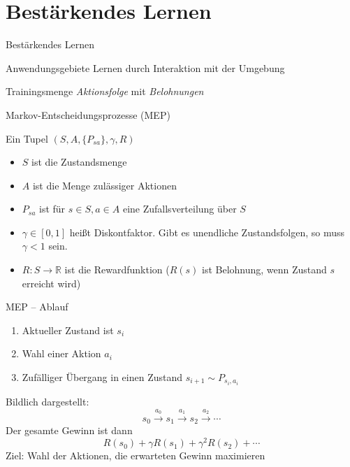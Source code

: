\documentclass[xcolor={dvipsnames,svgnames},draft]{beamer}
\begin{document}
\section{Bestärkendes Lernen}

\begin{frame}{Bestärkendes Lernen}

  \begin{exampleblock}{Anwendungsgebiete}
    Lernen durch Interaktion mit der Umgebung
  \end{exampleblock}

  \begin{block}{Trainingsmenge}
    \textit{Aktionsfolge} mit \textit{Belohnungen}
  \end{block}

\end{frame}

\begin{frame}{Markov-Entscheidungsprozesse (MEP)}

  \begin{definition}
    Ein Tupel $(S, A, \{P_{sa}\},\gamma,R)$
    \begin{itemize}
    \item $S$ ist die Zustandsmenge
    \item $A$ ist die Menge zulässiger Aktionen
    \item $P_{sa}$ ist für $s \in S, a \in A$ eine Zufallsverteilung über $S$
    \item $\gamma \in \left[ 0, 1 \right]$ heißt Diskontfaktor. Gibt es
      unendliche Zustandsfolgen, so muss $\gamma < 1$ sein.
    \item $R : S \to \mathbb{R}$ ist die Rewardfunktion ($R(s)$ ist
      Belohnung, wenn Zustand $s$ erreicht wird)
    \end{itemize}
  \end{definition}
\end{frame}

\begin{frame}{MEP -- Ablauf}
  \begin{enumerate}
  \item Aktueller Zustand ist $s_i$
  \item Wahl einer Aktion $a_i$
  \item Zufälliger Übergang in einen Zustand $s_{i+1} \sim P_{s_i,a_i}$
  \end{enumerate}
  Bildlich dargestellt:
  \[
    s_0 \xrightarrow{a_0} s_1 \xrightarrow{a_1} s_2 \xrightarrow{a_2} \cdots
  \]
  Der gesamte Gewinn ist dann
  \[
    R(s_0) + \gamma R(s_1) + \gamma^2 R(s_2) + \cdots
  \]
  Ziel: Wahl der Aktionen, die erwarteten Gewinn maximieren
\end{frame}
\end{document}
